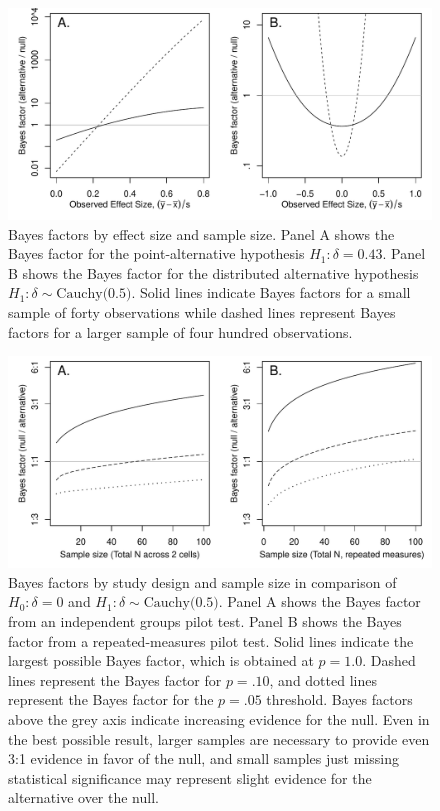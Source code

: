\documentclass[man]{apa6}
\begin{document}
\begin{figure}
\includegraphics[width=\textwidth, keepaspectratio]{BFfigure2.pdf}
\caption{Bayes factors by effect size and sample size. Panel A shows the Bayes factor for the point-alternative hypothesis $H_1: \delta = 0.43$. Panel B shows the Bayes factor for the distributed alternative hypothesis $H_1: \delta \sim \mbox{Cauchy(0.5)}$. Solid lines indicate Bayes factors for a small sample of forty observations while dashed lines represent Bayes factors for a larger sample of four hundred observations.}
\label{BFNfig}
\end{figure}

\begin{figure}
\includegraphics[width=\textwidth, keepaspectratio]{BFminmax.pdf}
\caption{Bayes factors by study design and sample size in comparison of $H_0: \delta = 0$ and $H_1: \delta \sim \mbox{Cauchy(0.5)}$. Panel A shows the Bayes factor from an independent groups pilot test. Panel B shows the Bayes factor from a repeated-measures pilot test. Solid lines indicate the largest possible Bayes factor, which is obtained at $p = 1.0$. Dashed lines represent the Bayes factor for $p = .10$, and dotted lines represent the Bayes factor for the $p = .05$ threshold. Bayes factors above the grey axis indicate increasing evidence for the null. Even in the best possible result, larger samples are necessary to provide even 3:1 evidence in favor of the null, and small samples just missing statistical significance may represent slight evidence for the alternative over the null.}
\label{BFMinMax}
\end{figure}
\end{document}
